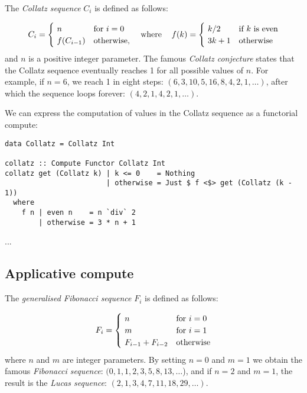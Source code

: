 The \emph{Collatz sequence} $C_i$ is defined as follows:

\[
C_{i} = {\begin{cases}~n&{\text{for }}i=0\\~f(C_{i-1})&{\text{otherwise}},\end{cases}}\hspace{12pt}\text{where}\hspace{12pt}f(k)={\begin{cases}~k/2&{\text{if }}k\text{ is even}\\~3k+1&{\text{otherwise}}\end{cases}}
\vspace{2mm}
\]
\noindent
and $n$ is a positive integer parameter. The famous \emph{Collatz conjecture}
states that the Collatz sequence eventually reaches 1 for all possible values of
$n$. For example, if $n=6$, we reach 1 in eight steps:
$(6, 3, 10, 5, 16, 8, 4, 2, 1, \dots)$, after which the sequence loops forever:
$(4, 2, 1, 4, 2, 1, \dots)$.

We can express the computation of values in the Collatz sequence as a functorial
compute:

\begin{verbatim}
data Collatz = Collatz Int

collatz :: Compute Functor Collatz Int
collatz get (Collatz k) | k <= 0    = Nothing
                        | otherwise = Just $ f <$> get (Collatz (k - 1))
  where
    f n | even n    = n `div` 2
        | otherwise = 3 * n + 1
\end{verbatim}

...


\subsection{Applicative compute}\label{sec-compute-applicative}
The \emph{generalised Fibonacci sequence} $F_i$ is defined as follows:

\[
F_{i} = {\begin{cases}~n&{\text{for }}i=0\\~m&{\text{for }}i=1\\~F_{i-1}+F_{i-2}&{\text{otherwise}}\end{cases}}
\vspace{2mm}
\]
\noindent
where $n$ and $m$ are integer parameters. By setting $n=0$ and $m=1$ we obtain
the famous \emph{Fibonacci sequence}: $(0, 1, 1, 2, 3, 5, 8, 13, \dots$), and if
$n=2$ and $m=1$, the result is the \emph{Lucas sequence}:
$(2, 1, 3, 4, 7, 11, 18, 29, \dots)$.

